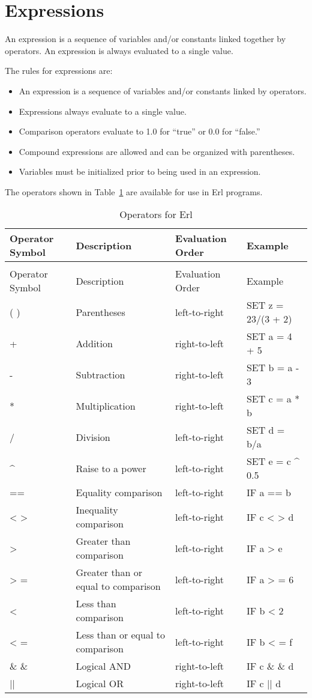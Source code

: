 \section{Expressions}\label{expressions}

An expression is a sequence of variables and/or constants linked together by operators. An expression is always evaluated to a single value.

The rules for expressions are:

\begin{itemize}
\item
  An expression is a sequence of variables and/or constants linked by operators.
\item
  Expressions always evaluate to a single value.
\item
  Comparison operators evaluate to 1.0 for ``true'' or 0.0 for ``false.''
\item
  Compound expressions are allowed and can be organized with parentheses.
\item
  Variables must be initialized prior to being used in an expression.
\end{itemize}

The operators shown in Table~\ref{table:operators-for-erl} are available for use in Erl programs.

\begin{longtable}[c]{p{1.5in}p{1.5in}p{1.5in}p{1.5in}}
\caption{Operators for Erl \label{table:operators-for-erl}} \tabularnewline
\toprule 
Operator Symbol & Description & Evaluation Order & Example \tabularnewline
\midrule
\endfirsthead

\caption[]{Operators for Erl} \tabularnewline
\toprule 
Operator Symbol & Description & Evaluation Order & Example \tabularnewline
\midrule
\endhead

( ) & Parentheses & left-to-right & SET z = 23/(3 + 2) \tabularnewline
+ & Addition & right-to-left & SET a = 4 + 5 \tabularnewline
- & Subtraction & right-to-left & SET b = a - 3 \tabularnewline
* & Multiplication & right-to-left & SET c = a * b \tabularnewline
/ & Division & left-to-right & SET d = b/a \tabularnewline
\^{} & Raise to a power & left-to-right & SET e = c \^{} 0.5 \tabularnewline
== & Equality comparison & left-to-right & IF a == b \tabularnewline
< > ~ & Inequality comparison & left-to-right & IF c  < >  d \tabularnewline
> ~ & Greater than comparison & left-to-right & IF a  >  e \tabularnewline
> = & Greater than or equal to comparison & left-to-right & IF a  > = 6 \tabularnewline
< ~ & Less than comparison & left-to-right & IF b  <  2 \tabularnewline
< = & Less than or equal to comparison & left-to-right & IF b  < = f \tabularnewline
\& \& & Logical AND & right-to-left & IF c  \& \&  d \tabularnewline
|| & Logical OR & right-to-left & IF c || d \tabularnewline
\bottomrule
\end{longtable}

